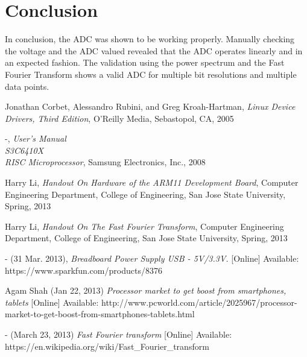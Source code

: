 \documentclass[10pt,conference]{IEEEtran}
\begin{document}
\pagebreak

%
%
\section{Conclusion}
In conclusion, the ADC was shown to be working properly. Manually checking the voltage and the ADC valued revealed that the ADC operates linearly and in an expected fashion. The validation using the power spectrum and the Fast Fourier Transform shows a valid ADC for multiple bit resolutions and multiple data points.


%
%
\begin{thebibliography}{9}
Jonathan Corbet, Alessandro Rubini, and Greg Kroah-Hartman,
\emph{Linux Device Drivers, Third Edition},
O'Reilly Media,
Sebastopol, CA,
2005

-,
\emph{User's Manual \\ S3C6410X \\ RISC Microprocessor},
Samsung Electronics, Inc.,
2008

Harry Li,
\emph{Handout On Hardware of the ARM11 Development Board},
Computer Engineering Department, College of Engineering,
 San Jose State University,
Spring, 2013

Harry Li,
\emph{Handout On The Fast Fourier Transform},
Computer Engineering Department, College of Engineering,
 San Jose State University,
Spring, 2013

- (31 Mar. 2013),
\emph{Breadboard Power Supply USB - 5V/3.3V.}
[Online]
Available: https://www.sparkfun.com/products/8376

Agam Shah (Jan 22, 2013)
\emph{Processor market to get boost from smartphones, tablets}
[Online]
Available: http://www.pcworld.com/article/2025967/processor-market-to-get-boost-from-smartphones-tablets.html

- (March 23, 2013)
\emph{Fast Fourier transform}
[Online]
Available: https://en.wikipedia.org/wiki/Fast\_Fourier\_transform

\end{thebibliography}
\end{document}
